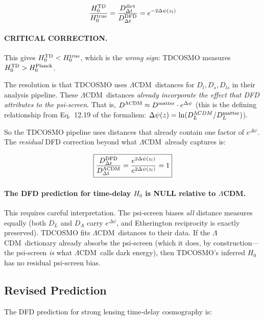 \documentclass[11pt,a4paper]{article}
\newcommand{\LCDM}{$\Lambda$CDM}
\newcommand{\Dpsi}{\Delta\psi}
\begin{document}
\begin{equation}
\frac{H_0^{\rm TD}}{H_0^{\rm true}}
= \frac{D_{\Delta t}^{\rm dict}}{D_{\Delta t}^{\rm DFD}}
= e^{-2\Dpsi(z_l)}
\end{equation}

\paragraph{CRITICAL CORRECTION.}
This gives $H_0^{\rm TD} < H_0^{\rm true}$, which is the
\emph{wrong sign}: TDCOSMO measures $H_0^{\rm TD} > H_0^{\rm Planck}$.

The resolution is that TDCOSMO uses \LCDM\ distances for
$D_l, D_s, D_{ls}$ in their analysis pipeline.  These \LCDM\ distances
\emph{already incorporate the effect that DFD attributes to the psi-screen}.
That is, $D^{\rm \Lambda CDM} \approx D^{\rm matter} \cdot e^{\Dpsi}$
(this is the defining relationship from Eq.~12.19 of the formalism:
$\Dpsi(z) = \ln(D_L^{\Lambda CDM}/D_L^{\rm matter})$).

So the TDCOSMO pipeline uses distances that already contain one
factor of $e^{\Dpsi}$.  The \emph{residual} DFD correction beyond
what \LCDM\ already captures is:

\begin{equation}
\boxed{
\frac{D_{\Delta t}^{\rm DFD}}{D_{\Delta t}^{\rm \Lambda CDM}}
= \frac{e^{2\Dpsi(z_l)}}{e^{2\Dpsi(z_l)}} = 1
}
\label{eq:time-delay-null}
\end{equation}

\paragraph{The DFD prediction for time-delay $H_0$ is NULL relative to \LCDM.}

This requires careful interpretation.  The psi-screen biases \emph{all}
distance measures equally (both $D_L$ and $D_A$ carry $e^{\Dpsi}$,
and Etherington reciprocity is exactly preserved).  TDCOSMO fits
\LCDM\ distances to their data.  If the \LCDM\ dictionary already
absorbs the psi-screen (which it does, by construction---the psi-screen
\emph{is} what \LCDM\ calls dark energy), then TDCOSMO's inferred
$H_0$ has no residual psi-screen bias.

\subsection{Revised Prediction}

The DFD prediction for strong lensing time-delay cosmography is:
\end{document}

